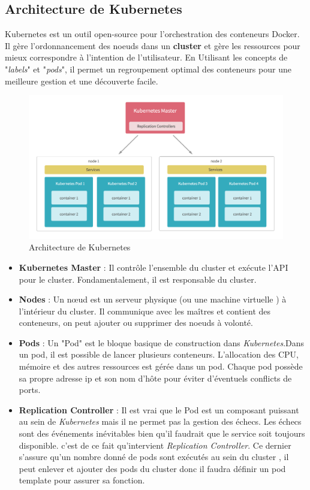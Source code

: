 \begin{onehalfspace}
\subsection{Architecture de Kubernetes}
Kubernetes est un outil open-source pour l'orchestration des conteneurs Docker. Il gère l'ordonnancement des noeuds dans un \textbf{cluster} et gère les ressources pour mieux correspondre à l'intention de l'utilisateur. En Utilisant les concepts de "\emph{labels}" et "\emph{pods}", il permet un regroupement optimal des conteneurs pour une meilleure gestion et une découverte facile.
\begin{figure}[H]
\centering
\includegraphics [scale=0.5]{chapitre3/assets/archkuber.png}
\caption{Architecture de Kubernetes}
\end{figure}

\begin{itemize}
\item \textbf{Kubernetes Master} : Il contrôle l'ensemble du cluster et exécute l'API pour le cluster. Fondamentalement, il est responsable du cluster.

\item \textbf{Nodes} : Un nœud est un serveur physique (ou une machine virtuelle ) à l'intérieur du cluster. Il communique avec les maîtres et contient des conteneurs, on peut ajouter ou supprimer des noeuds à volonté.

\item \textbf{Pods} : Un "Pod" est le bloque basique de construction dans \emph{Kubernetes}.Dans un pod, il est possible de lancer plusieurs conteneurs. L'allocation des CPU, mémoire et des autres ressources est gérée dans un pod. Chaque pod possède sa propre adresse ip et son nom d'hôte pour éviter d'éventuels conflicts de ports.

\item \textbf{Replication Controller} : Il est vrai que le Pod est un composant puissant au sein de \emph{Kubernetes} mais il ne permet pas la gestion des échecs. Les échecs sont des événements inévitables bien qu'il faudrait que le service soit toujours disponible. c'est de ce fait qu'intervient \emph{Replication Controller}. Ce dernier s'assure qu'un nombre donné de pods sont exécutés au sein du cluster , il peut enlever et ajouter des pods du cluster donc il faudra définir un pod template pour assurer sa fonction.


\end{itemize}
\end{onehalfspace}

